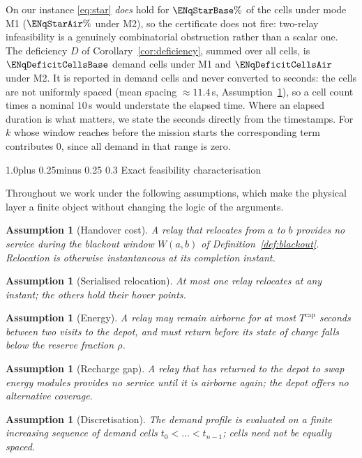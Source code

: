 \documentclass[11pt]{article}
\makeatletter
\def\subsection{\@startsection{subsection}{2}{\z@}%
    {1.0\baselineskip plus 0.25\baselineskip minus 0.25\baselineskip}%
    {0.3\baselineskip}%
    {\normalfont\normalsize\itshape}}%
\theoremstyle{dshplain}
\theoremstyle{dshdefn}
\newtheorem{assumption}[theorem]{Assumption}
\makeatother
\begin{document}
\noindent On our instance \eqref{eq:star} \emph{does} hold for
$\ENqStarBase\%$ of the cells under mode M1 ($\ENqStarAir\%$ under M2),
so the certificate does not fire: two-relay infeasibility is a genuinely
combinatorial obstruction rather than a scalar one. The deficiency $D$ of
Corollary~\ref{cor:deficiency}, summed over all cells, is $\ENqDeficitCellsBase$
demand cells under M1 and $\ENqDeficitCellsAir$ under M2. It is reported in demand
cells and never converted to seconds: the cells are not uniformly
spaced (mean spacing $\approx 11.4$\,s, Assumption~\ref{asm:discrete}), so a cell
count times a nominal $10$\,s would understate the elapsed time. Where an elapsed
duration is what matters, we state the seconds directly from the timestamps. For
$k$ whose window reaches before the mission starts the corresponding term
contributes $0$, since all demand in that range is zero.

\subsection{Exact feasibility characterisation}
\label{sec:theory}

Throughout we work under the following assumptions, which make the physical
layer a finite object without changing the logic of the arguments.

\begin{assumption}[Handover cost]\label{asm:handover}
A relay that relocates from $a$ to $b$ provides no service during the blackout
window $W(a,b)$ of Definition~\ref{def:blackout}. Relocation is otherwise instantaneous at its
completion instant.
\end{assumption}
\begin{assumption}[Serialised relocation]\label{asm:serial}
At most one relay relocates at any instant; the others hold their hover points.
\end{assumption}
\begin{assumption}[Energy]\label{asm:energy}
A relay may remain airborne for at most $T^{\mathrm{cap}}$ seconds between two
visits to the depot, and must return before its state of charge falls below the
reserve fraction $\rho$.
\end{assumption}
\begin{assumption}[Recharge gap]\label{asm:recharge}
A relay that has returned to the depot to swap energy modules provides no service
until it is airborne again; the depot offers no alternative coverage.
\end{assumption}
\begin{assumption}[Discretisation]\label{asm:discrete}
The demand profile is evaluated on a finite increasing sequence of
\emph{demand cells} $t_0<\dots<t_{n-1}$; cells need not be equally spaced.
\end{assumption}
\end{document}
